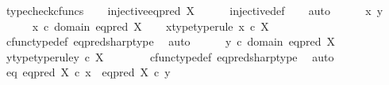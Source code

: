 \begin{isabellebody}
\ typecheck{\isacharunderscore}{\kern0pt}cfuncs\isanewline
\ \ \isamarkupfalse%
\ {\isachardoublequoteopen}injective{\isacharparenleft}{\kern0pt}eq{\isacharunderscore}{\kern0pt}pred\ X\isactrlsup {\isasymsharp}{\isacharparenright}{\kern0pt}{\isachardoublequoteclose}\isanewline
\ \ \ \ \isamarkupfalse%
\ injective{\isacharunderscore}{\kern0pt}def\isanewline
\ \ \isamarkupfalse%
\ {\isacharparenleft}{\kern0pt}auto{\isacharparenright}{\kern0pt}\isanewline
\ \ \ \ \isamarkupfalse%
\ x\ y\ \isanewline
\ \ \ \ \isamarkupfalse%
\ {\isachardoublequoteopen}x\ {\isasymin}\isactrlsub c\ domain\ {\isacharparenleft}{\kern0pt}eq{\isacharunderscore}{\kern0pt}pred\ X\isactrlsup {\isasymsharp}{\isacharparenright}{\kern0pt}{\isachardoublequoteclose}\ \isamarkupfalse%
\ \isamarkupfalse%
\ x{\isacharunderscore}{\kern0pt}type{\isacharbrackleft}{\kern0pt}type{\isacharunderscore}{\kern0pt}rule{\isacharbrackright}{\kern0pt}{\isacharcolon}{\kern0pt}\ {\isachardoublequoteopen}x\ {\isasymin}\isactrlsub c\ X{\isachardoublequoteclose}\isanewline
\ \ \ \ \ \ \isamarkupfalse%
\ cfunc{\isacharunderscore}{\kern0pt}type{\isacharunderscore}{\kern0pt}def\ eq{\isacharunderscore}{\kern0pt}pred{\isacharunderscore}{\kern0pt}sharp{\isacharunderscore}{\kern0pt}type\ \isamarkupfalse%
\ auto\isanewline
\ \ \ \ \isamarkupfalse%
\ {\isachardoublequoteopen}y\ {\isasymin}\isactrlsub c\ domain\ {\isacharparenleft}{\kern0pt}eq{\isacharunderscore}{\kern0pt}pred\ X\isactrlsup {\isasymsharp}{\isacharparenright}{\kern0pt}{\isachardoublequoteclose}\ \isamarkupfalse%
\ \isamarkupfalse%
\ y{\isacharunderscore}{\kern0pt}type{\isacharbrackleft}{\kern0pt}type{\isacharunderscore}{\kern0pt}rule{\isacharbrackright}{\kern0pt}{\isacharcolon}{\kern0pt}{\isachardoublequoteopen}y\ {\isasymin}\isactrlsub c\ X{\isachardoublequoteclose}\isanewline
\ \ \ \ \ \ \isamarkupfalse%
\ cfunc{\isacharunderscore}{\kern0pt}type{\isacharunderscore}{\kern0pt}def\ eq{\isacharunderscore}{\kern0pt}pred{\isacharunderscore}{\kern0pt}sharp{\isacharunderscore}{\kern0pt}type\ \isamarkupfalse%
\ auto\isanewline
\ \ \ \ \isamarkupfalse%
\ eq{\isacharcolon}{\kern0pt}\ {\isachardoublequoteopen}eq{\isacharunderscore}{\kern0pt}pred\ X\isactrlsup {\isasymsharp}\ {\isasymcirc}\isactrlsub c\ x\ {\isacharequal}{\kern0pt}\ eq{\isacharunderscore}{\kern0pt}pred\ X\isactrlsup {\isasymsharp}\ {\isasymcirc}\isactrlsub c\ y{\isachardoublequoteclose}\isanewline

\end{isabellebody}
